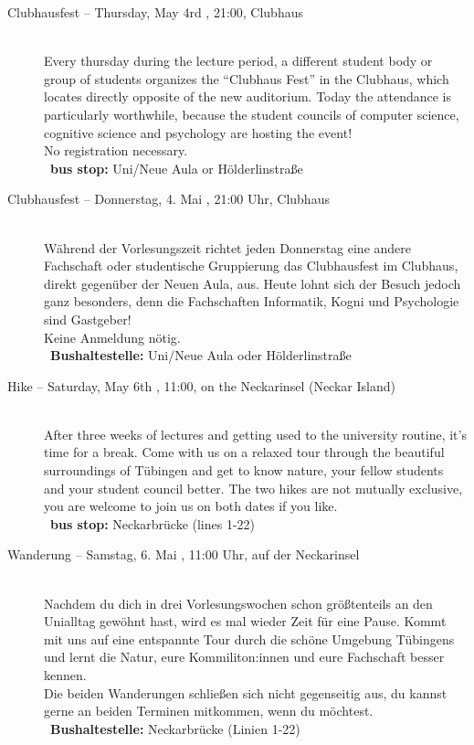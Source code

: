 \begin{description}
\ifml
    \item[Clubhausfest -- Thursday, May 4rd \YEAR, 21:00, Clubhaus]\ \\
	Every thursday during the lecture period, a different student body or group of students organizes the "`Clubhaus Fest"' in
	the Clubhaus, which locates directly opposite of the new auditorium. Today the attendance is particularly worthwhile, because
	the student councils of computer science, cognitive science and psychology are hosting the event! \\
	No registration necessary.\\
	~\textbf{bus stop:} Uni/Neue Aula or Hölderlinstraße
\else
    \item[Clubhausfest -- Donnerstag, 4. Mai \YEAR, 21:00 Uhr, Clubhaus]\ \\
	Während der Vorlesungszeit richtet jeden Donnerstag eine andere Fachschaft oder studentische Gruppierung das Clubhausfest
	im Clubhaus, direkt gegenüber der Neuen Aula, aus. Heute lohnt sich der Besuch jedoch ganz besonders, denn die Fachschaften
	Informatik, Kogni und Psychologie sind Gastgeber! \\
	Keine Anmeldung nötig.\\
	~\textbf{Bushaltestelle:} Uni/Neue Aula oder Hölderlinstraße
\fi

\ifbachelor \pagebreak \fi
\ifmaster \ifbinfo \else \pagebreak \fi \fi

\ifml
	\item[Hike -- Saturday, May 6th \YEAR, 11:00, on the Neckarinsel (Neckar Island)]~\\
	After three weeks of lectures and getting used to the university routine, it's time for a break.
	Come with us on a relaxed tour through the beautiful surroundings of Tübingen and get to know nature, your fellow students and your student council better.
	The two hikes are not mutually exclusive, you are welcome to join us on both dates if you like.\\
	~\textbf{bus stop:} Neckarbrücke (lines 1-22)
\else
	\item[Wanderung -- Samstag, 6. Mai \YEAR, 11:00 Uhr, auf der Neckarinsel]~\\
	Nachdem du dich in drei Vorlesungswochen schon größtenteils an den Unialltag gewöhnt hast, wird es mal wieder Zeit für eine Pause.
	Kommt mit uns auf eine entspannte Tour durch die schöne Umgebung Tübingens und lernt die Natur, eure Kommiliton:innen und eure Fachschaft besser kennen.\\
	Die beiden Wanderungen schließen sich nicht gegenseitig aus, du kannst gerne an beiden Terminen mitkommen, wenn du möchtest.\\
	~\textbf{Bushaltestelle:} Neckarbrücke (Linien 1-22)
\fi


\end{description}
